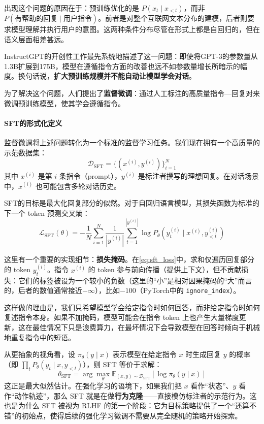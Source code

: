 出现这个问题的原因在于：预训练优化的是 $P(x_t \mid x_{<t})$，而非 $P(\text{有帮助的回复} \mid \text{用户指令})$。前者是对整个互联网文本分布的建模，后者则要求模型理解并执行用户的意图。这两种条件分布尽管在形式上都是自回归的，但在语义层面相差甚远。

InstructGPT的开创性工作最先系统地描述了这一问题：即使将GPT-3的参数量从1.3B扩展到175B，模型在遵循指令方面的改善也远不如参数量增长所暗示的幅度\cite{ouyang2022traininglanguagemodelsfollow}。换句话说，\textbf{扩大预训练规模并不能自动让模型学会对话}。

为了解决这个问题，人们提出了\textbf{监督微调}：通过人工标注的高质量指令—回复对来微调预训练模型，使其学会遵循指令。

\paragraph{SFT的形式化定义}

监督微调将上述问题转化为一个标准的监督学习任务。我们现在拥有一个高质量的示范数据集：
\begin{equation}
    \mathcal{D}_{\text{SFT}} = \{(x^{(i)}, y^{(i)})\}_{i=1}^{N}
\end{equation}
其中 $x^{(i)}$ 是第 $i$ 条指令（prompt），$y^{(i)}$ 是标注者撰写的理想回复。在对话场景中，$x^{(i)}$ 也可能包含多轮对话历史。

SFT的目标是最大化回复部分的似然。对于自回归语言模型，其损失函数为标准的下一个 token 预测交叉熵：
\begin{equation}\label{eq:sft_loss}
    \mathcal{L}_{\text{SFT}}(\theta) = -\frac{1}{N}\sum_{i=1}^{N}\frac{1}{|y^{(i)}|}\sum_{t=1}^{|y^{(i)}|} \log P_\theta(y^{(i)}_t \mid x^{(i)}, y^{(i)}_{<t})
\end{equation}

这里有一个重要的实现细节：\textbf{损失掩码}。在\eqref{eq:sft_loss}中，求和仅遍历回复部分的 token $y^{(i)}_t$。指令 $x^{(i)}$ 的 token 参与前向传播（提供上下文），但不贡献损失：它们的标签被设为一个较小的负数（这里的“小”是相对因果掩码的“大”而言的，后者的数值通常接近$-\infty$），比如$-100$（PyTorch中的 \texttt{ignore_index}）。

这样做的理由是，我们只希望模型学会给定指令时如何回答，而非给定指令时如何复述指令本身。如果不加掩码，模型可能会在指令 token 上也产生大量梯度更新，这在最佳情况下只是浪费算力，在最坏情况下会导致模型在回答时倾向于机械地重复指令中的短语。

从更抽象的视角看，设 $\pi_\theta(y \mid x)$ 表示模型在给定指令 $x$ 时生成回复 $y$ 的概率（即 $\prod_t P_\theta(y_t \mid x, y_{<t})$），则 SFT 等价于求解：
\begin{equation}
    \theta_{\text{SFT}} = \arg\max_\theta \mathbb{E}_{(x,y) \sim \mathcal{D}_{\text{SFT}}}[\log \pi_\theta(y \mid x)]
\end{equation}
这正是最大似然估计。在强化学习的语境下，如果我们把 $x$ 看作“状态”、$y$ 看作“动作轨迹”，那么 SFT 就是在做\textbf{行为克隆}——直接模仿标注者的示范行为。这也是为什么 SFT 被视为 RLHF 的第一个阶段：它为目标策略提供了一个“还算不错”的初始点，使得后续的强化学习微调不需要从完全随机的策略开始探索。

